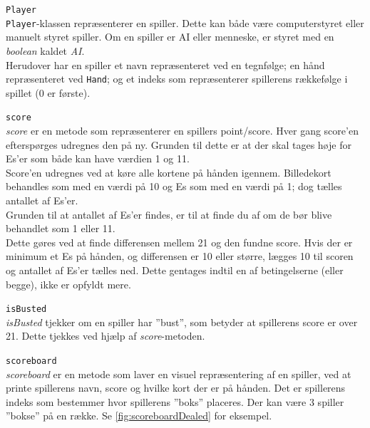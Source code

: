 \documentclass[a4paper]{article}
\newcommand{\namedref}[1]{\autoref{#1}} %
\begin{document}
\begin{description}
        \item{\texttt{Player}}~\\
        \texttt{Player}-klassen repræsenterer en spiller. Dette kan både være computerstyret eller 
        manuelt styret spiller. Om en spiller er AI eller menneske, er styret med en \textit{boolean} 
        kaldet \textit{AI}.\\
        Herudover har en spiller et navn repræsenteret ved en tegnfølge; en hånd repræsenteret ved 
        \texttt{Hand}; og et indeks som repræsenterer spillerens rækkefølge i spillet (0 er første).
        
        \begin{description}
          \item{{\texttt{score}}}~\\
          \textit{score} er en metode som repræsenterer en spillers point/score. Hver gang score'en 
          efterspørges udregnes den på ny. Grunden til dette er at der skal tages høje for Es'er som 
          både kan have værdien 1 og 11. \\
          Score'en udregnes ved at køre alle kortene på hånden igennem. Billedekort behandles som med en
          værdi på 10 og Es som med en værdi på 1; dog tælles antallet af Es'er. \\
          Grunden til at antallet af Es'er findes, er til at finde du af om de bør blive behandlet som 1 
          eller 11. \\
          Dette gøres ved at finde differensen mellem 21 og den fundne score. Hvis der er minimum et Es 
          på hånden, og differensen er 10 eller større, lægges 10 til scoren og antallet af Es'er tælles 
          ned. Dette gentages indtil en af betingelserne (eller begge), ikke er opfyldt mere.
          
          \item{\texttt{isBusted}}~\\
          \textit{isBusted} tjekker om en spiller har ”bust”, som betyder at spillerens score er over 21.
          Dette tjekkes ved hjælp af \textit{score}-metoden.
          
          
          \item{\texttt{scoreboard}}~\\
          \textit{scoreboard} er en metode som laver en visuel repræsentering af en spiller, ved at 
          printe spillerens navn, score og hvilke kort der er på hånden. Det er spillerens indeks som 
          bestemmer hvor spillerens ”boks” placeres. Der kan være 3 spiller ”bokse” på en række. Se  
          \namedref{fig:scoreboardDealed} for eksempel.
        \end{description}
        

\end{description}
\end{document}
